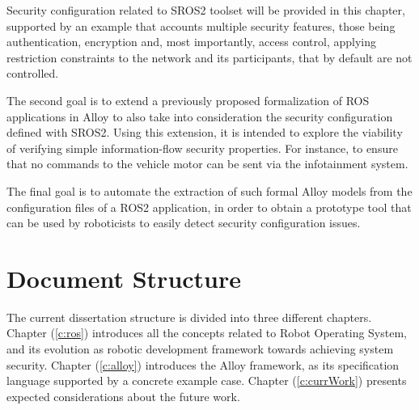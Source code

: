 Security configuration related to SROS2 toolset will be provided in this chapter, supported by an example that accounts multiple security features, those being authentication, encryption and, most importantly, access control, applying restriction constraints to the network and its participants, that by default are not controlled.

The second goal is to extend a previously proposed \cite{9341085} formalization of ROS applications in Alloy \cite{alloy-6, lwspecification} to also take into consideration the security configuration defined with SROS2. Using this extension, it is intended to explore the viability of verifying simple information-flow security properties. For instance, to ensure that no commands to the vehicle motor can be sent via the infotainment system.

The final goal is to automate the extraction of such formal Alloy models from the configuration files of a ROS2 application, in order to obtain a prototype tool that can be used by roboticists to easily detect security configuration issues.

\section{Document Structure}


The current dissertation structure is divided into three different chapters. Chapter (\ref{c:ros}) introduces all the concepts related to Robot Operating System, and its evolution as robotic development framework towards achieving system security. Chapter (\ref{c:alloy}) introduces the Alloy framework, as its specification language supported by a concrete example case. %
Chapter (\ref{c:currWork}) presents expected considerations about the future work. 